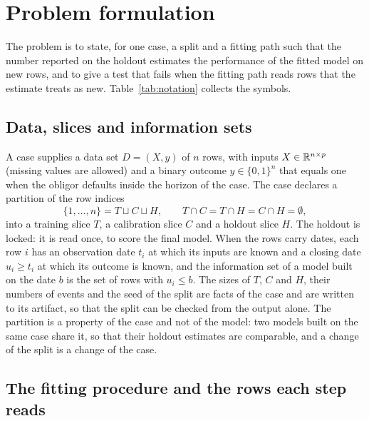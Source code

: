 \section{Problem formulation}
\label{sec:problem}

The problem is to state, for one case, a split and a fitting path such that the number reported on the holdout estimates the performance of the fitted model on new rows, and to give a test that fails when the fitting path reads rows that the estimate treats as new. Table~\ref{tab:notation} collects the symbols.



\subsection{Data, slices and information sets}

A case supplies a data set $D=(X,y)$ of $n$ rows, with inputs $X\in\mathbb{R}^{n\times p}$ (missing values are allowed) and a binary outcome $y\in\{0,1\}^n$ that equals one when the obligor defaults inside the horizon of the case. The case declares a partition of the row indices
\begin{equation}
\{1,\dots,n\}=T\sqcup C\sqcup H,\qquad T\cap C=T\cap H=C\cap H=\emptyset,
\label{eq:partition}
\end{equation}
into a training slice $T$, a calibration slice $C$ and a holdout slice $H$. The holdout is locked: it is read once, to score the final model. When the rows carry dates, each row $i$ has an observation date $t_i$ at which its inputs are known and a closing date $u_i\ge t_i$ at which its outcome is known, and the information set of a model built on the date $b$ is the set of rows with $u_i\le b$. The sizes of $T$, $C$ and $H$, their numbers of events and the seed of the split are facts of the case and are written to its artifact, so that the split can be checked from the output alone. The partition is a property of the case and not of the model: two models built on the same case share it, so that their holdout estimates are comparable, and a change of the split is a change of the case.

\subsection{The fitting procedure and the rows each step reads}

